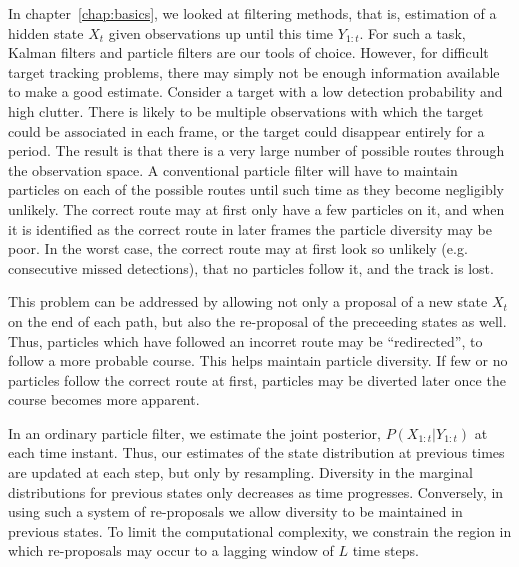In chapter~\ref{chap:basics}, we looked at filtering methods, that is, estimation of a hidden state $X_t$ given observations up until this time $Y_{1:t}$. For such a task, Kalman filters and particle filters are our tools of choice. However, for difficult target tracking problems, there may simply not be enough information available to make a good estimate. Consider a target with a low detection probability and high clutter. There is likely to be multiple observations with which the target could be associated in each frame, or the target could disappear entirely for a period. The result is that there is a very large number of possible routes through the observation space. A conventional particle filter will have to maintain particles on each of the possible routes until such time as they become negligibly unlikely. The correct route may at first only have a few particles on it, and when it is identified as the correct route in later frames the particle diversity may be poor. In the worst case, the correct route may at first look so unlikely (e.g. consecutive missed detections), that no particles follow it, and the track is lost.

This problem can be addressed by allowing not only a proposal of a new state $X_t$ on the end of each path, but also the re-proposal of the preceeding states as well. Thus, particles which have followed an incorret route may be ``redirected'', to follow a more probable course. This helps maintain particle diversity. If few or no particles follow the correct route at first, particles may be diverted later once the course becomes more apparent.

In an ordinary particle filter, we estimate the joint posterior, $P(X_{1:t}|Y_{1:t})$ at each time instant. Thus, our estimates of the state distribution at previous times are updated at each step, but only by resampling. Diversity in the marginal distributions for previous states only decreases as time progresses. Conversely, in using such a system of re-proposals we allow diversity to be maintained in previous states. To limit the computational complexity, we constrain the region in which re-proposals may occur to a lagging window of $L$ time steps.

